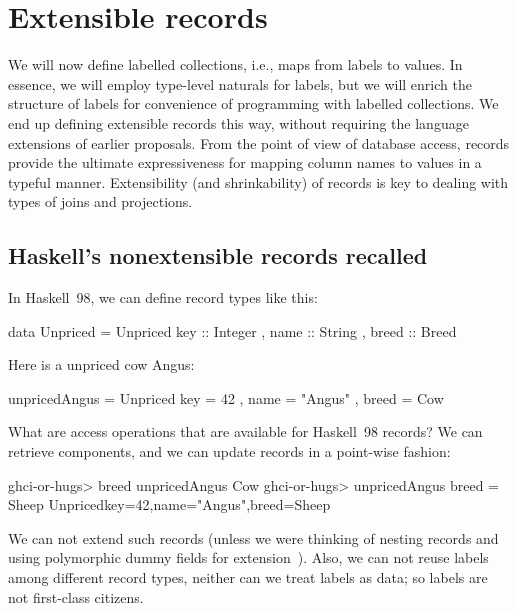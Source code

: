 \documentclass[nocopyrightspace,preprint]{sigplan-proc}
\begin{document}
\section{Extensible records}
\label{S:Record}

We will now define labelled collections, i.e., maps from labels to
values. In essence, we will employ type-level naturals for labels, but
we will enrich the structure of labels for convenience of programming
with labelled collections. We end up defining extensible records this
way, without requiring the language extensions of earlier
proposals. From the point of view of database access, records provide
the ultimate expressiveness for mapping column names to values in a
typeful manner. Extensibility (and shrinkability) of records is key to
dealing with types of joins and projections.


\medskip

\subsection*{Haskell's nonextensible records recalled}

In Haskell~98, we can define record types like this:

\begin{code}
 data Unpriced = Unpriced { key   :: Integer
                          , name  :: String
                          , breed :: Breed }
\end{code}

Here is a unpriced cow Angus:

\begin{code}
 unpricedAngus = Unpriced { key    = 42
                          , name   = "Angus"
                          , breed  = Cow }
\end{code}

What are access operations that are available for Haskell~98 records?
We can retrieve components, and we can update records in a point-wise
fashion:

\begin{code}
 ghci-or-hugs> breed unpricedAngus
 Cow
 ghci-or-hugs> unpricedAngus { breed = Sheep }
 Unpriced{key=42,name="Angus",breed=Sheep}
\end{code}

We can not extend such records (unless we were thinking of nesting
records and using polymorphic dummy fields for
extension~\cite{Burton90}). Also, we can not reuse labels among
different record types, neither can we treat labels as data; so labels
are not first-class citizens.
\end{document}
